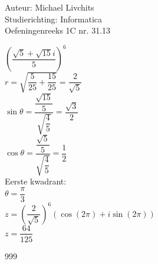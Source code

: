 \documentclass[a4paper]{article}
\begin{document}
  
\noindent \large Auteur: Michael Livchits \\
\noindent \large Studierichting: Informatica\\
\noindent \large Oefeningenreeks 1C nr. 31.13\\

\medskip

\normalsize

$\left(\dfrac{\sqrt{5}+\sqrt{15}i}{5}\right)^6$\\

$r = \sqrt{\dfrac{5}{25}+\dfrac{15}{25}} = \dfrac{2}{\sqrt{5}}$\\

$\sin\theta = \dfrac{\dfrac{\sqrt{15}}{5}}{\sqrt{\dfrac{4}{5}}} = \dfrac{\sqrt{3}}{2}$\\

$\cos\theta = \dfrac{\dfrac{\sqrt{5}}{5}}{\sqrt{\dfrac{4}{5}}} = \dfrac{1}{2}$\\

Eerste kwadrant:\\

$\theta = \dfrac{\pi}{3}$\\

$z = \left(\dfrac{2}{\sqrt{5}}\right)^6\left(\cos\left(2\pi\right)+i\sin\left(2\pi\right)\right)$\\

$z = \dfrac{64}{125}$\\

\begin{thebibliography}{999}
\end{thebibliography}
\end{document}
